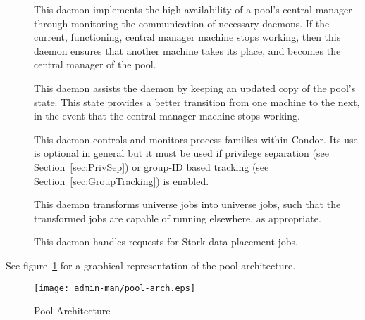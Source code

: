 \begin{description}
\item[] This daemon
implements the high availability of a pool's central manager
through monitoring the communication of necessary daemons.
If the current, functioning, central manager machine
stops working, then this daemon ensures that another 
machine takes its place, and becomes the central manager of
the pool.

\item[] This daemon
assists the  daemon by keeping an updated copy of the
pool's state. This state provides a better transition
from one machine to the next, in the event 
that the central manager machine stops working.

\item[] This daemon
controls and monitors process families within Condor. Its use
is optional in general but it must be used if privilege separation
(see Section~\ref{sec:PrivSep}) or group-ID based tracking (see
Section~\ref{sec:GroupTracking}) is enabled.

\item[] This daemon 
transforms  universe jobs into 
universe jobs, such that the transformed jobs are capable
of running elsewhere, as appropriate.

\item[] This daemon
handles requests for Stork data placement jobs.

\end{description} 


See figure~\ref{fig:pool-arch} for a graphical representation of the
pool architecture. 

\begin{figure}[hbt]
\centering
\texttt{[image: admin-man/pool-arch.eps]}
\caption{\label{fig:pool-arch}Pool Architecture}
\end{figure}

